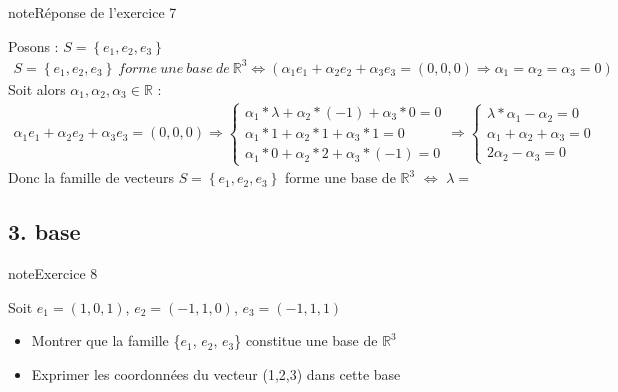 \documentclass[letterpaper,10pt,french]{jupyterBook}
\begin{document}
\begin{sphinxadmonition}{note}{Réponse de l’exercice 7}

\sphinxAtStartPar
Posons : \(S = \left\{  e_1, e_2, e_3 \right\} \)
\begin{equation*}
\begin{split}
 
 S = \left\{  e_1, e_2, e_3 \right\} ~forme ~une ~ base ~ de ~ \mathbb{R}^3 \Leftrightarrow (\alpha_1 e_1 + \alpha_2 e_2 + \alpha_3 e_3= (0,0,0) \Rightarrow \alpha_1 =\alpha_2= \alpha_3 = 0)
 
 \end{split}
\end{equation*}
\sphinxAtStartPar
Soit alors \(\alpha_1, \alpha_2,\alpha_3 \in \mathbb{R}\) :
\begin{equation*}
\begin{split}
\alpha_1 e_1 + \alpha_2 e_2 + \alpha_3 e_3= (0,0,0) \Rightarrow 
    \begin{cases}
      \alpha_1*\lambda+ \alpha_2* (-1) +\alpha_3*0= 0 \\
      \alpha_1*1 + \alpha_2*1 + \alpha_3*1= 0 \\
      \alpha_1*0 + \alpha_2*2 + \alpha_3*(-1)= 0 
      \end{cases}
\Rightarrow        
    \begin{cases}
      \lambda*\alpha_1- \alpha_2= 0 \\
      \alpha_1 + \alpha_2 + \alpha_3= 0 \\
      2\alpha_2 - \alpha_3= 0 
      \end{cases}
\end{split}
\end{equation*}
\sphinxAtStartPar
Donc la famille de vecteurs \(S = \left\{  e_1, e_2, e_3 \right\} \) forme une base de \(\mathbb{R}^3\) \(\Leftrightarrow\)  \(\lambda = \)
\end{sphinxadmonition}


\subsection{3. base}
\label{\detokenize{S_xe9rie1:base}}
\begin{sphinxadmonition}{note}{Exercice 8}

\sphinxAtStartPar
Soit \(e_1 = (1,0,1)\), \(e_2= (-1,1,0)\), \(e_3 = (-1,1,1)\)
\begin{itemize}
\item {} 
\sphinxAtStartPar
Montrer que la famille \{\(e_1\), \(e_2\), \(e_3\)\} constitue une base de \(\mathbb{R}^3\)

\item {} 
\sphinxAtStartPar
Exprimer les coordonnées du vecteur (1,2,3) dans cette base

\end{itemize}
\end{sphinxadmonition}
\end{document}
